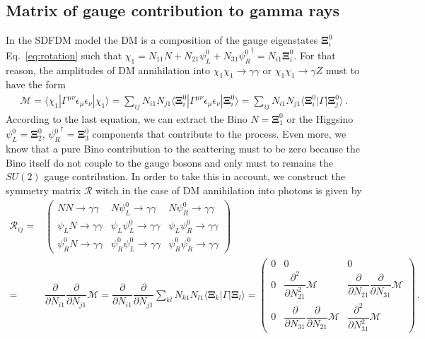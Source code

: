 \subsection{ Matrix of gauge contribution to gamma rays }
%
In the SDFDM model the DM is a composition of the gauge eigenstates $\boldsymbol{\Xi}_i^0$ Eq.~\eqref{eq:rotation} such that $\chi_1=N_{11}N+N_{21}\psi_L^0+N_{31}{\psi_R^0}^{\dagger}=N_{i1}\boldsymbol{\Xi}_i^0$. For that reason, the amplitudes of DM annihilation into $\chi_1\chi_1\to\gamma\gamma$ or $\chi_1\chi_1\to\gamma Z$ must to have the form 
\begin{align}
\mathcal{M}=\langle\chi_1|\Gamma^{\mu\nu}\epsilon_{\mu}\epsilon_{\nu}|\chi_1\rangle
=\sum_{ij}N_{i1}N_{j1}\langle\boldsymbol{\Xi}_i^0|\Gamma^{\mu\nu}\epsilon_{\mu}\epsilon_{\nu}|\boldsymbol{\Xi}_i^0\rangle
=\sum_{ij}N_{i1}N_{j1}\langle\boldsymbol{\Xi}_i^0|\Gamma|\boldsymbol{\Xi}_j^0\rangle\,.
\end{align}
According to the last equation, we can extract the Bino $N=\boldsymbol{\Xi}_1^0$ or the Higgsino $\psi_{L}^0=\boldsymbol{\Xi}_2^0$, ${\psi_{R}^0}^{\dagger}=\boldsymbol{\Xi}_3^0$ components that contribute to the process. Even more,  we know that a pure Bino contribution to the scattering must to be zero because the Bino itself do not couple to the gauge bosons and only must to remains the $SU(2)$ gauge contribution. In order to take this in account, we construct the symmetry matrix $\mathcal{R}$ witch in the case of DM annihilation into photons is given by
%
\begin{align}
\label{eq:Dmatrix}
\mathcal{R}_{ij}
=&\begin{pmatrix}
NN\to\gamma\gamma & N\psi_L^0\to\gamma\gamma & N\psi_R^0\to\gamma\gamma\\
\psi_LN\to\gamma\gamma & \psi_L\psi_L^0\to\gamma\gamma & \psi_L\psi_R^0\to\gamma\gamma\\
\psi_R^0N\to\gamma\gamma & \psi_R^0\psi_L^0\to\gamma\gamma & \psi_R^0\psi_R^0\to\gamma\gamma
\end{pmatrix}\nonumber\\
=&\dfrac{\partial}{\partial N_{i1}}\dfrac{\partial}{\partial N_{j1}}\mathcal{M}
=\dfrac{\partial}{\partial N_{i1}}\dfrac{\partial}{\partial N_{j1}}\sum_{kl}N_{k1}N_{l1}\langle\boldsymbol{\Xi}_k| \Gamma|\boldsymbol{\Xi}_l\rangle 
=\begin{pmatrix}
0  & 0 & 0 \\
0 & \dfrac{\partial^2}{\partial N_{21}^2}\mathcal{M} & \dfrac{\partial}{\partial N_{21}}\dfrac{\partial}{\partial N_{31}}\mathcal{M} \\
0 & \dfrac{\partial}{\partial N_{31}}\dfrac{\partial}{\partial N_{21}}\mathcal{M} & \dfrac{\partial^2}{\partial N_{31}^2}\mathcal{M} 
\end{pmatrix}\,.
\end{align}
